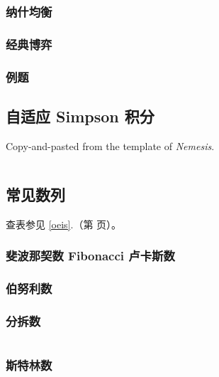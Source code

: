 \documentclass[a4paper, twoside]{article}
\newcommand\detailedref[1]{\ref{#1}.\nameref{#1}（第 \pageref{#1} 页）}
\begin{document}
\begin{multicols}{2}
				\subsubsection{纳什均衡}
					

				\subsubsection{经典博弈}
					\label{classicgame}
					

				\subsubsection{例题}
					

			\subsection{自适应 Simpson 积分}
				Copy-and-pasted from the template of \textit{Nemesis}.
				\inputminted{cpp}{../src/math/simpson.cpp}

			\subsection{常见数列}
				查表参见 \detailedref{oeis}。

				\subsubsection{斐波那契数 Fibonacci 卢卡斯数}
					

				\subsubsection[伯努利数~Bernoulli 自然数幂次和]{伯努利数}
					\label{BernoulliNumber}
					
				
				\subsubsection{分拆数}
					\label{partition}
					\inputminted{cpp}{../src/math/分拆数.cpp}
				
				\subsubsection[斯特林数~Stiring]{斯特林数}
					
				

\end{multicols}
\end{document}
